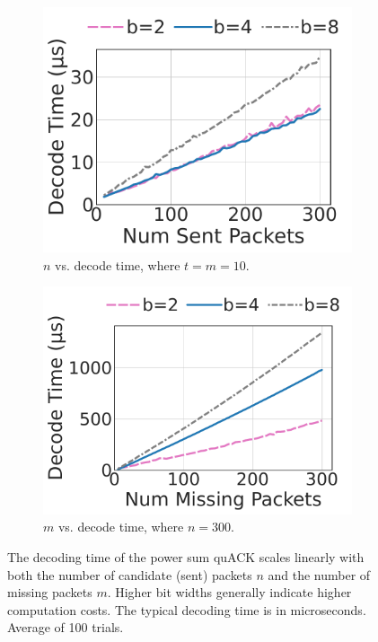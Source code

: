 \begin{figure}[t]
\centering
\begin{subfigure}{0.37\columnwidth}
	\includegraphics[width=\linewidth,trim={3mm 0 7mm 0},clip]{quack/figures/fig2a_quack_num_candidates_vs_decode_time.pdf}
	\caption{$n$ vs. decode time, where $t=m=10$.}
	\label{fig:quack:psum-decode:n}
\end{subfigure}
\begin{subfigure}{0.4\columnwidth}
	\includegraphics[width=\linewidth,trim={3mm 0 7mm 0},clip]{quack/figures/fig2b_quack_num_missing_vs_decode_time.pdf}
	\caption{$m$ vs. decode time, where $n=300$.}
	\label{fig:quack:psum-decode:m}
\end{subfigure}
\caption{The decoding time of the power sum quACK scales linearly with both the
 number of candidate (sent) packets $n$ and the number of missing packets $m$.
 Higher bit widths generally indicate higher computation costs. The typical
 decoding time is in microseconds. Average of 100 trials. }
\label{fig:quack:psum-decode}
\end{figure}
